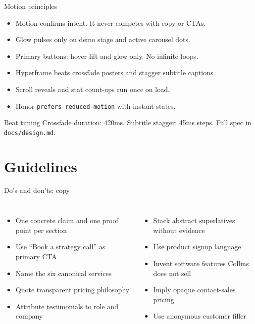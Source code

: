 \documentclass[aspectratio=169,10pt]{beamer}
\begin{document}
\begin{frame}{Motion principles}

  \vspace{0.6em}
  \begin{itemize}
    \item Motion confirms intent. It never competes with copy or CTAs.
    \item Glow pulses only on demo stage and active carousel dots.
    \item Primary buttons: hover lift and glow only. No infinite loops.
    \item Hyperframe beats crossfade posters and stagger subtitle captions.
    \item Scroll reveals and stat count-ups run once on load.
    \item Honor \texttt{prefers-reduced-motion} with instant states.
  \end{itemize}

  \vspace{0.6em}
  \begin{collinsblock}{Beat timing}
    Crossfade duration: 420ms. Subtitle stagger: 45ms steps. Full spec in \texttt{docs/design.md}.
  \end{collinsblock}
\end{frame}

\section{Guidelines}

\begin{frame}{Do's and don'ts: copy}
  \begin{columns}[T,onlytextwidth]
    \vspace{0.4em}
    \begin{itemize}
      \item One concrete claim and one proof point per section
      \item Use ``Book a strategy call'' as primary CTA
      \item Name the six canonical services
      \item Quote transparent pricing philosophy
      \item Attribute testimonials to role and company
    \end{itemize}

    \vspace{0.4em}
    \begin{itemize}
      \item Stack abstract superlatives without evidence
      \item Use product signup language
      \item Invent software features Collins does not sell
      \item Imply opaque contact-sales pricing
      \item Use anonymous customer filler
    \end{itemize}
  \end{columns}
\end{frame}
\end{document}
